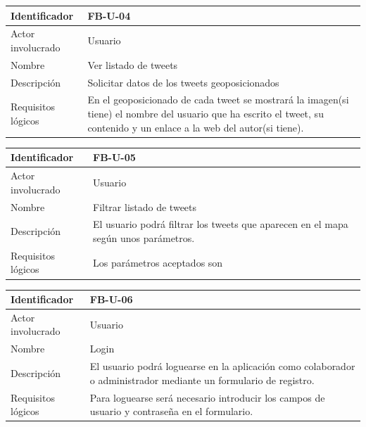 \begin{table}[!htbp]
\centering
\begin{tabular}{|p{3cm}|p{10cm}|}
\hline
Identificador & FB-U-04 \\ \hline
Actor involucrado & Usuario \\ \hline
Nombre & Ver listado de tweets\\ \hline
Descripción & Solicitar datos de los tweets geoposicionados \\ \hline
Requisitos lógicos & En el geoposicionado de cada tweet se mostrará la imagen(si tiene) el nombre del usuario que ha escrito el tweet, su contenido y un enlace a la web del autor(si tiene).\\ \hline
\end{tabular}
\end{table}


\begin{table}[!htbp]
\centering
\begin{tabular}{|p{3cm}|p{10cm}|}
\hline
Identificador & FB-U-05 \\ \hline
Actor involucrado & Usuario \\ \hline
Nombre & Filtrar listado de tweets\\ \hline
Descripción & El usuario podrá filtrar los tweets que aparecen en el mapa según unos parámetros.  \\ \hline
Requisitos lógicos & Los parámetros aceptados son  \\ \hline
\end{tabular}
\end{table}

\begin{table}[!htbp]
\centering
\begin{tabular}{|p{3cm}|p{10cm}|}
\hline
Identificador & FB-U-06 \\ \hline
Actor involucrado & Usuario \\ \hline
Nombre & Login\\ \hline
Descripción & El usuario podrá loguearse en la aplicación como colaborador o administrador mediante un formulario de registro.  \\ \hline
Requisitos lógicos & Para loguearse será necesario introducir los campos de usuario y contraseña en el formulario.\\ \hline
\end{tabular}
\end{table}

